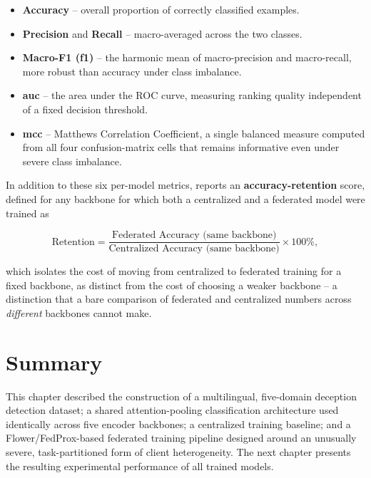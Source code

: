 \begin{itemize}
    \item \textbf{Accuracy} -- overall proportion of correctly classified examples.
    \item \textbf{Precision} and \textbf{Recall} -- macro-averaged across the two classes.
    \item \textbf{Macro-F1 (\gls{f1})} -- the harmonic mean of macro-precision and macro-recall, more robust than accuracy under class imbalance.
    \item \textbf{\gls{auc}} -- the area under the ROC curve, measuring ranking quality independent of a fixed decision threshold.
    \item \textbf{\gls{mcc}} -- Matthews Correlation Coefficient, a single balanced measure computed from all four confusion-matrix cells that remains informative even under severe class imbalance.
\end{itemize}

In addition to these six per-model metrics,  reports an \textbf{accuracy-retention} score, defined for any backbone for which both a centralized and a federated model were trained as

\begin{equation}
\text{Retention} = \frac{\text{Federated Accuracy (same backbone)}}{\text{Centralized Accuracy (same backbone)}} \times 100\%,
\end{equation}

which isolates the cost of moving from centralized to federated training for a fixed backbone, as distinct from the cost of choosing a weaker backbone -- a distinction that a bare comparison of federated and centralized numbers across \emph{different} backbones cannot make.

\section{Summary}

This chapter described the construction of a multilingual, five-domain deception detection dataset; a shared attention-pooling classification architecture used identically across five encoder backbones; a centralized training baseline; and a Flower/FedProx-based federated training pipeline designed around an unusually severe, task-partitioned form of client heterogeneity. The next chapter presents the resulting experimental performance of all trained models.
